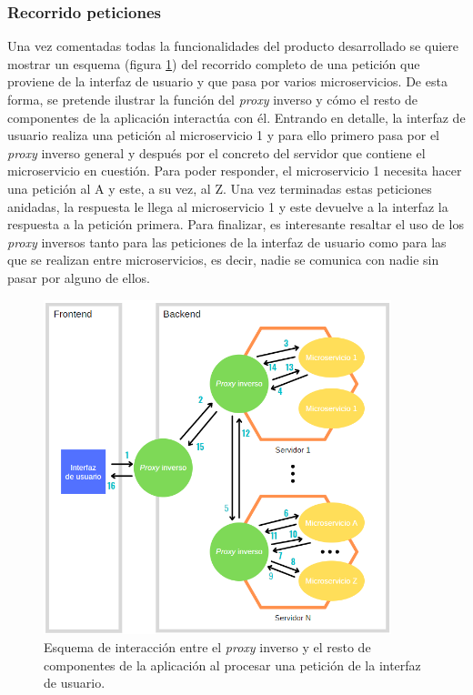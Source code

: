 \documentclass[11pt,spanish,listoffigures]{tfgetsinf}
\begin{document}

			\subsubsection{Recorrido peticiones}

Una vez comentadas todas la funcionalidades del producto desarrollado se quiere mostrar un esquema (figura \ref{esquemaInteraccionProxyInverso}) del recorrido completo de una petición que proviene de la interfaz de usuario y que pasa por varios microservicios. De esta forma, se pretende ilustrar la función del \emph{proxy} inverso y cómo el resto de componentes de la aplicación interactúa con él. Entrando en detalle, la interfaz de usuario realiza una petición al microservicio 1 y para ello primero pasa por el \emph{proxy} inverso general y después por el concreto del servidor que contiene el microservicio en cuestión. Para poder responder, el microservicio 1 necesita hacer una petición al A y este, a su vez, al Z. Una vez terminadas estas peticiones anidadas, la respuesta le llega al microservicio 1 y este devuelve a la interfaz la respuesta a la petición primera. Para finalizar, es interesante resaltar el uso de los \emph{proxy} inversos tanto para las peticiones de la interfaz de usuario como para las que se realizan entre microservicios, es decir, nadie se comunica con nadie sin pasar por alguno de ellos.

\begin{figure}[ht]
\centering
\includegraphics[width=0.9\textwidth]{imagenes/esquemaInteraccionProxyInverso}
\caption{Esquema de interacción entre el \emph{proxy} inverso y el resto de componentes de la aplicación al procesar una petición de la interfaz de usuario.}
	\label{esquemaInteraccionProxyInverso}
\end{figure}
\end{document}
